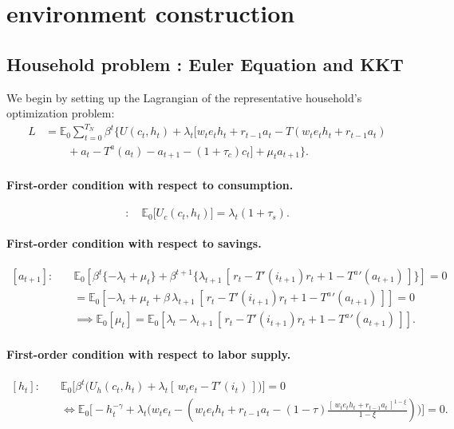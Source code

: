 \documentclass[11pt]{article}
\begin{document}
\section{environment construction}
\subsection{Household problem : Euler Equation and KKT}

We begin by setting up the Lagrangian of the representative household’s optimization problem:
\begin{equation}
\begin{aligned}
L &= \mathbb{E}_0 \sum_{t=0}^{T_N} \beta^t \Big\{ U(c_t,h_t) 
+ \lambda_t \big[ w_t e_t h_t + r_{t-1} a_t - T(w_t e_t h_t + r_{t-1} a_t) \\
&\qquad + a_t - T^a(a_t) - a_{t+1} - (1+\tau_c)c_t \big] 
+ \mu_t a_{t+1} \Big\}.
\end{aligned}
\end{equation}

\paragraph{First-order condition with respect to consumption.}
\begin{equation}
[c_t]: \quad \mathbb{E}_0 \big[ U_c(c_t,h_t) \big] 
= \lambda_t (1+\tau_s).
\end{equation}

\paragraph{First-order condition with respect to savings.}
\begin{equation}
\begin{aligned}
[a_{t+1}]:\quad &
\mathbb{E}_0 \!\left[ \beta^t \{-\lambda_t + \mu_t\} 
+ \beta^{t+1} \big\{ \lambda_{t+1}\,[\,r_t - T'(i_{t+1})r_t + 1 - {T^a}'(a_{t+1})\,] \big\} \right] = 0 \\
&= \mathbb{E}_0 \!\left[ -\lambda_t + \mu_t 
+ \beta \,\lambda_{t+1}\,[\,r_t - T'(i_{t+1})r_t + 1 - {T^a}'(a_{t+1})\,] \right] = 0 \\
&\implies \mathbb{E}_0[\mu_t] 
= \mathbb{E}_0 \!\left[ \lambda_t 
- \lambda_{t+1}\,[\,r_t - T'(i_{t+1})r_t + 1 - {T^a}'(a_{t+1})\,] \right].
\end{aligned}
\end{equation}

\paragraph{First-order condition with respect to labor supply.}
\begin{equation}
\begin{aligned}
[h_t]: \quad &
\mathbb{E}_0 \Big[ \beta^t \big( U_h(c_t,h_t) + \lambda_t[\,w_t e_t - T'(i_t)\,] \big) \Big] = 0 \\
&\iff \mathbb{E}_0 \Big[ -h_t^{-\gamma} 
+ \lambda_t \big( w_t e_t 
- (w_t e_t h_t + r_{t-1}a_t 
- (1-\tau)\tfrac{[\,w_t e_t h_t + r_{t-1}a_t\,]^{1-\xi}}{1-\xi}) \big) \Big] = 0.
\end{aligned}
\end{equation}
\end{document}
